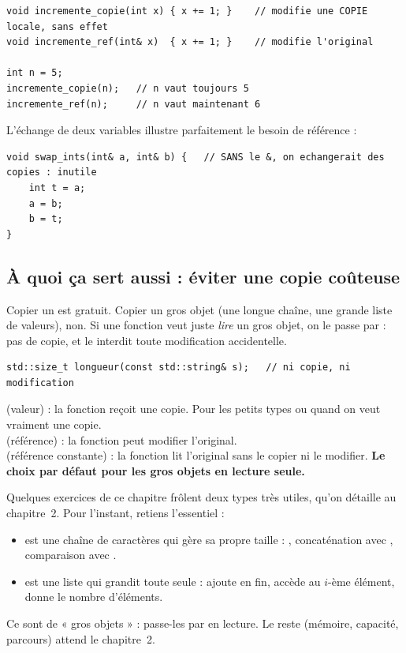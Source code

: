 \documentclass[11pt]{article}
\begin{document}
\begin{lstlisting}
void incremente_copie(int x) { x += 1; }    // modifie une COPIE locale, sans effet
void incremente_ref(int& x)  { x += 1; }    // modifie l'original

int n = 5;
incremente_copie(n);   // n vaut toujours 5
incremente_ref(n);     // n vaut maintenant 6
\end{lstlisting}

L'échange de deux variables illustre parfaitement le besoin de référence :

\begin{lstlisting}
void swap_ints(int& a, int& b) {   // SANS le &, on echangerait des copies : inutile
    int t = a;
    a = b;
    b = t;
}
\end{lstlisting}

\subsection*{À quoi ça sert aussi : éviter une copie coûteuse}

Copier un  est gratuit. Copier un gros objet (une longue chaîne, une
grande liste de valeurs), non. Si une fonction veut juste \emph{lire} un gros
objet, on le passe par  : pas de copie, et le 
interdit toute modification accidentelle.

\begin{lstlisting}
std::size_t longueur(const std::string& s);   // ni copie, ni modification
\end{lstlisting}

\begin{aretenir}
 (valeur) : la fonction reçoit une copie. Pour les petits types ou
quand on veut vraiment une copie.\\
 (référence) : la fonction peut modifier l'original.\\
 (référence constante) : la fonction lit l'original sans le
copier ni le modifier. \textbf{Le choix par défaut pour les gros objets en
lecture seule.}
\end{aretenir}

\begin{aretenir}
Quelques exercices de ce chapitre frôlent deux types très utiles, qu'on détaille
au chapitre~2. Pour l'instant, retiens l'essentiel :
\begin{itemize}[noitemsep]
    \item {} est une chaîne de caractères qui gère sa propre
          taille : , concaténation avec \code{+}, comparaison
          avec \code{==}.
    \item {} est une liste qui grandit toute seule :
           ajoute en fin,  accède au
          $i$-ème élément,  donne le nombre d'éléments.
\end{itemize}
Ce sont de « gros objets » : passe-les par  en lecture. Le reste
(mémoire, capacité, parcours) attend le chapitre~2.
\end{aretenir}
\end{document}
